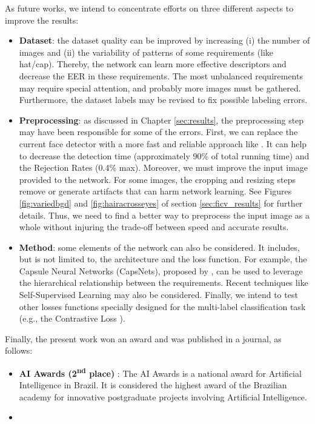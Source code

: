 
As future works, we intend to concentrate efforts on three different aspects to improve the results:

\begin{itemize}
\item \textbf{Dataset}: the dataset quality can be improved by increasing (i) the number of images and (ii) the variability of patterns of some requirements (like hat/cap). Thereby, the network can learn more effective descriptors and decrease the EER in these requirements. The most unbalanced requirements may require special attention, and probably more images must be gathered. Furthermore, the dataset labels may be revised to fix possible labeling errors.

\item \textbf{Preprocessing}: as discussed in Chapter \ref{sec:results}, the preprocessing step may have been responsible for some of the errors. First, we can replace the current face detector with a more fast and reliable approach like \cite{faceboxes}. It can help to decrease the detection time (approximately 90\% of total running time) and the Rejection Rates (0.4\% max). Moreover, we must improve the input image provided to the network. For some images, the cropping and resizing steps remove or generate artifacts that can harm network learning. See Figures \ref{fig:variedbgd} and \ref{fig:hairacrosseyes} of section \ref{sec:ficv_results} for further details. Thus, we need to find a better way to preprocess the input image as a whole without injuring the trade-off between speed and accurate results.

\item \textbf{Method}: some elements of the network can also be considered. It includes, but is not limited to, the architecture and the loss function. For example, the Capsule Neural Networks (CapsNets), proposed by \cite{sabour2017dynamic}, can be used to leverage the hierarchical relationship between the requirements. Recent techniques like Self-Supervised Learning \citep{doersch2017multi} may also be considered. Finally, we intend to test other losses functions specially designed for the multi-label classification task (e.g., the Contrastive Loss \citep{khosla2020supervised}).
\end{itemize}

Finally, the present work won an award and was published in a journal, as follows:

\begin{itemize}
\item \textbf{AI Awards (2\textsuperscript{nd} place)} \citep{aiaward}: The AI Awards is a national award for Artificial Intelligence in Brazil. It is considered the highest award of the Brazilian academy for innovative postgraduate projects involving Artificial Intelligence.

\item {}
\end{itemize}